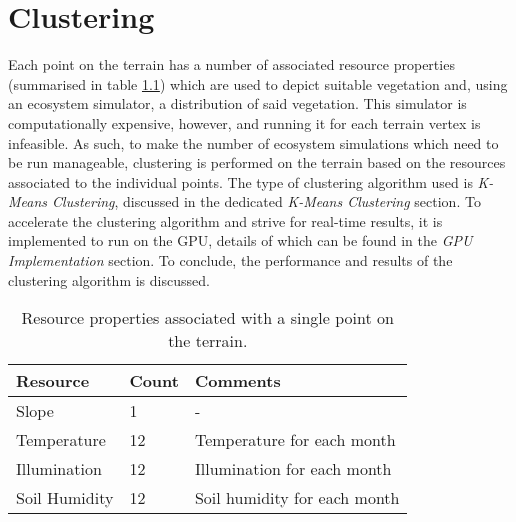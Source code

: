 \chapter{Clustering}

Each point on the terrain has a number of associated resource properties (summarised in table \ref{tab:point_resources}) which are used to depict suitable vegetation and, using an ecosystem simulator, a distribution of said vegetation. This simulator is computationally expensive, however, and running it for each terrain vertex is infeasible. As such, to make the number of ecosystem simulations which need to be run manageable, clustering is performed on the terrain based on the resources associated to the individual points. The type of clustering algorithm used is \textit{K-Means Clustering}, discussed in the dedicated \textit{K-Means Clustering} section. To accelerate the clustering algorithm and strive for real-time results, it is implemented to run on the GPU, details of which can be found in the \textit{GPU Implementation} section. To conclude, the performance and results of the clustering algorithm is discussed.

\begin{table}[h]
  \centering
	    \begin{tabular}{|p{6cm}|p{3cm}|p{6cm}|}
		\hline	
  	    \textbf{Resource} & \textbf{Count} & \textbf{Comments} \\
  	    \hline	
  	    Slope & 1 & - \\
		\hline
  	    Temperature & 12 & Temperature for each month \\
		\hline
  	    Illumination & 12 & Illumination for each month \\
		\hline
  	    Soil Humidity & 12 & Soil humidity for each month \\
		\hline
		\end{tabular}
		\caption{Resource properties associated with a single point on the terrain.}
	  \label{tab:point_resources}
\end{table}



